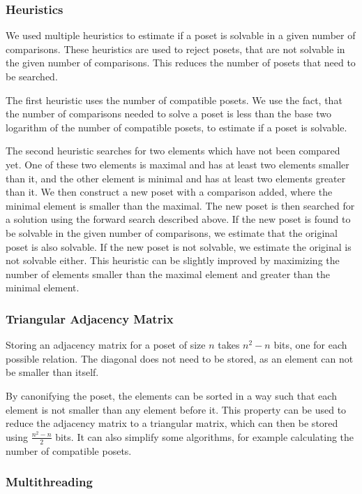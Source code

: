 \documentclass[10pt,journal,compsoc]{IEEEtran}
\begin{document}
\subsubsection{Heuristics}

We used multiple heuristics to estimate if a poset is solvable in a given number of comparisons.
These heuristics are used to reject posets, that are not solvable in the given number of comparisons.
This reduces the number of posets that need to be searched.

The first heuristic uses the number of compatible posets.
We use the fact, that the number of comparisons needed to solve a poset is less than the base two logarithm of the number of compatible posets,
to estimate if a poset is solvable.

The second heuristic searches for two elements which have not been compared yet.
One of these two elements is maximal and has at least two elements smaller than it,
and the other element is minimal and has at least two elements greater than it.
We then construct a new poset with a comparison added, where the minimal element is smaller than the maximal.
The new poset is then searched for a solution using the forward search described above.
If the new poset is found to be solvable in the given number of comparisons, we estimate that the original poset is also solvable.
If the new poset is not solvable, we estimate the original is not solvable either.
This heuristic can be slightly improved by maximizing the number of elements smaller than the maximal element and greater than the minimal element.

\subsubsection{Triangular Adjacency Matrix}
Storing an adjacency matrix for a poset of size $n$ takes $n^2 - n$ bits, one for each possible relation.
The diagonal does not need to be stored, as an element can not be smaller than itself.

By canonifying the poset, the elements can be sorted in a way such that each element is not smaller than any element before it.
This property can be used to reduce the adjacency matrix to a triangular matrix, which can then be stored using $\frac{n^2 - n}{2}$ bits.
It can also simplify some algorithms, for example calculating the number of compatible posets.

\subsubsection{Multithreading}
\end{document}
